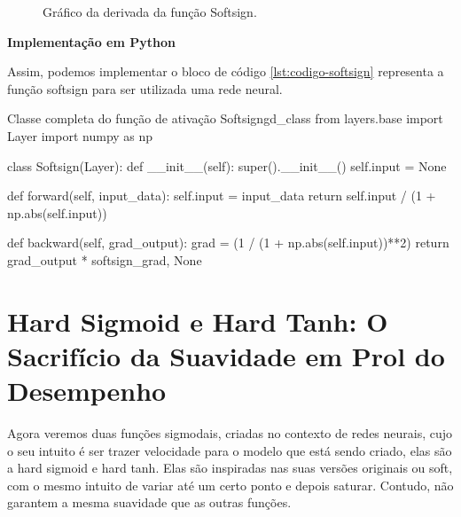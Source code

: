 \begin{figure}[h!]
    \centering
    \caption{Gráfico da derivada da função Softsign.}
    \label{fig:GraphSoftsignDerivative}
\end{figure}

\textbf{Implementação em Python}

Assim, podemos implementar o bloco de código \ref{lst:codigo-softsign} representa a função softsign para ser utilizada uma rede neural.

\begin{codelisting}{Classe completa do função de ativação Softsign}{gd_class}
from layers.base import Layer
import numpy as np

class Softsign(Layer):
    def __init__(self):
        super().__init__()
        self.input = None

    def forward(self, input_data):
        self.input = input_data
        return self.input / (1 + np.abs(self.input))

    def backward(self, grad_output):
        grad =  (1 / (1 + np.abs(self.input))**2)
        return grad_output * softsign_grad, None
\end{codelisting}

\section{Hard Sigmoid e Hard Tanh: O Sacrifício da Suavidade em Prol do Desempenho}

Agora veremos duas funções sigmodais, criadas no contexto de redes neurais, cujo o seu intuito é ser trazer velocidade para o modelo que está sendo criado, elas são a hard sigmoid e hard tanh. Elas são inspiradas nas suas versões originais ou soft, com o mesmo intuito de variar até um certo ponto e depois saturar. Contudo, não garantem a mesma suavidade que as outras funções.

